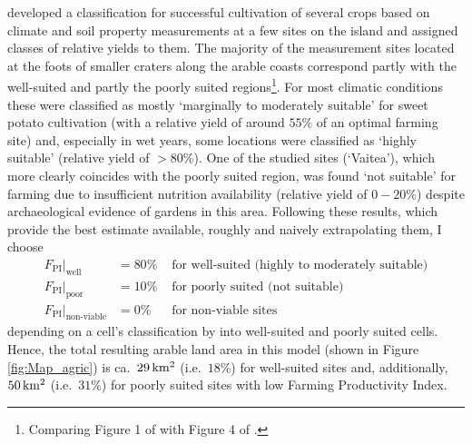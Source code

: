 \citet{Louwagie2006} developed a classification for successful cultivation of several crops based on climate and soil property measurements at a few sites on the island and assigned classes of relative yields to them. 
The majority of the measurement sites located at the foots of smaller craters along the arable coasts correspond partly with the well-suited and partly the poorly suited regions\footnote{Comparing Figure 1 of \citet{Louwagie2006} with Figure 4 of \citet{Puleston2017}.}. For most climatic conditions these were classified as mostly `marginally to moderately suitable' for sweet potato cultivation (with a relative yield of around $55\%$ of an optimal farming site) and, especially in wet years, some locations were classified as `highly suitable' (relative yield of $>80\%$).
 One of the studied sites (`Vaitea'), which more clearly coincides with the poorly suited region, was found `not suitable' for farming due to insufficient nutrition availability (relative yield of $0-20\%$) despite archaeological evidence of gardens in this area.
 Following these results, which provide the best estimate available, roughly and naively extrapolating them, I choose
 \begin{eqnarray*}
 	F_\text{PI}|_\text{well} & = 80\% & \text{ for well-suited (highly to moderately suitable)}\\
 	F_\text{PI}|_\text{poor} & = 10\%  & \text{ for poorly suited (not suitable)}\\
 	F_\text{PI}|_\text{non-viable} & = 0\% & \text{ for non-viable sites}
 \end{eqnarray*}
 depending on a cell's classification by \citet{Puleston2017} into well-suited and poorly suited cells.
 Hence, the total resulting arable land area in this model (shown in Figure \ref{fig:Map_agric}) is ca.\ $29\,  {\rm km^2}$ (i.e.\ $18\%$) for well-suited sites and, additionally, $50\, {\rm km^2}$ (i.e.\ $31\%$) for poorly suited sites with low Farming Productivity Index.

